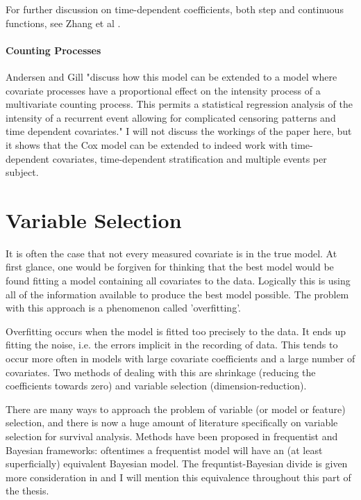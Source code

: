 For further discussion on time-dependent coefficients, both step and continuous functions, see Zhang et al .

\subsection{Counting Processes}

Andersen and Gill  "discuss how this model can be extended to a model where covariate processes have a proportional effect on the intensity process of a multivariate counting process. This permits a statistical regression analysis of the intensity of a recurrent event allowing for complicated censoring patterns and time dependent covariates." I will not discuss the workings of the paper here, but it shows that the Cox model can be extended to indeed work with time-dependent covariates, time-dependent stratification and multiple events per subject. 

\newpage
\part{Variable Selection}

It is often the case that not every measured covariate is in the true model. At first glance, one would be forgiven for thinking that the best model would be found fitting a model containing all covariates to the data. Logically this is using all of the information available to produce the best model possible. The problem with this approach is a phenomenon called 'overfitting'.

Overfitting occurs when the model is fitted too precisely to the data. It ends up fitting the noise, i.e. the errors implicit in the recording of data. This tends to occur more often in models with large covariate coefficients and a large number of covariates. Two methods of dealing with this are shrinkage (reducing the coefficients towards zero) and variable selection (dimension-reduction).

There are many ways to approach the problem of variable (or model or feature) selection, and there is now a huge amount of literature specifically on variable selection for survival analysis. Methods have been proposed in frequentist and Bayesian frameworks: oftentimes a frequentist model will have an (at least superficially) equivalent Bayesian model. The frequntist-Bayesian divide is given more consideration in  and I will mention this equivalence throughout this part of the thesis.

